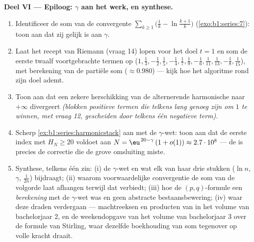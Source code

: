 \begin{problem}[{Weekendopgave --- $H_n = \ln n + \gamma +
\frac{1}{2n} + O(n^{-2})$, en het herschikken van $1 - \frac12 +
\frac13 - \dots$ tot $\frac{\ln 2}{2}$}]
\medskip
\noindent\textbf{Deel VI --- Epiloog: $\gamma$ aan het werk, en
synthese.}
\begin{enumerate}[resume]
  \item Identificeer de som van de convergente 
        $\sum_{k\geq1} \bigl(\frac1k - \ln\frac{k+1}{k}\bigr)$
        (\cref{exo:b1:series:7}): toon aan dat zij gelijk is aan
        $\gamma$.
  \item Laat het recept van Riemann (vraag 14) lopen voor het doel
        $t = 1$ en som de eerste twaalf voortgebrachte termen op
        ($1, \frac13, -\frac12, \frac15, -\frac14, \frac17,
        \frac19, -\frac16, \frac1{11}, \frac1{13}, -\frac18,
        \frac1{15}$), met berekening van de partiële som
        ($\approx 0.980$) --- kijk hoe het algoritme rond zijn
        doel ademt.
  \item Toon aan dat een zekere herschikking van de alternerende
        harmonische  naar $+\infty$ divergeert \emph{(blokken
        positieve termen die telkens lang genoeg zijn om $1$ te
        winnen, met vraag 12, gescheiden door telkens één
        negatieve term)}.
  \item Scherp \cref{ex:b1:series:harmonicstack} aan met de
        $\gamma$-wet: toon aan dat de eerste index met $H_N \geq
        20$ voldoet aan $N = \eu^{\,20 - \gamma}\,(1 + o(1))
        \approx 2.7\cdot10^{8}$ --- de  is
        precies de correctie die de grove omsluiting miste.
  \item Synthese, telkens één zin: (i) de $\gamma$-wet en wat elk
        van haar drie stukken ($\ln n$, $\gamma$, $\frac{1}{2n}$)
        bijdraagt; (ii) waarom voorwaardelijke convergentie de som
        van de volgorde laat afhangen terwijl  dat verbiedt; (iii) hoe de
        $(p,q)$-formule een \emph{berekening} met de $\gamma$-wet
        was en geen abstracte bestaansbewering; (iv) waar deze
        draden verdergaan --- machtreeksen en producten van
         in het volume van bachelorjaar 2, en de
        weekendopgave van het volume van bachelorjaar 3 over de
        formule van Stirling, waar dezelfde boekhouding van som
        tegenover  op volle kracht draait.
\end{enumerate}
\end{problem}
